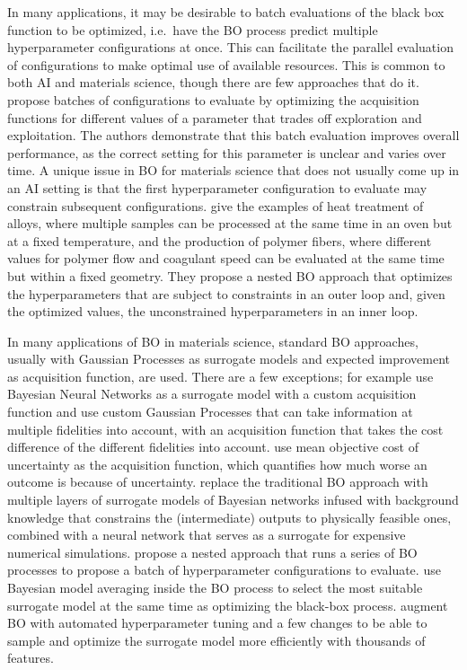 \documentclass{article}
\begin{document}
In many applications, it may be desirable to batch evaluations of the black box
function to be optimized, i.e.\ have the BO process predict multiple
hyperparameter configurations at once. This can facilitate the parallel
evaluation of configurations to make optimal use of available resources. This is
common to both AI and materials science, though there are few approaches that do
it. \cite{hase_phoenics_2018} propose batches of configurations to evaluate by
optimizing the acquisition functions for different values of a parameter that
trades off exploration and exploitation. The authors demonstrate that this batch
evaluation improves overall performance, as the correct setting for this
parameter is unclear and varies over time. A unique issue in BO for materials
science that does not usually come up in an AI setting is that the first
hyperparameter configuration to evaluate may constrain subsequent
configurations. \cite{vellanki2017} give the examples of heat treatment of
alloys, where multiple samples can be processed at the same time in an oven but
at a fixed temperature, and the production of polymer fibers, where different
values for polymer flow and coagulant speed can be evaluated at the same time
but within a fixed geometry. They propose a nested BO approach that optimizes
the hyperparameters that are subject to constraints in an outer loop and, given
the optimized values, the unconstrained hyperparameters in an inner loop.

\medskip

In many applications of BO in materials science, standard BO approaches, usually
with Gaussian Processes as surrogate models and expected improvement as
acquisition function, are used. There are a few exceptions; for example
\cite{hase_phoenics_2018} use Bayesian Neural Networks as a surrogate model with
a custom acquisition function and \cite{pilania_multi-fidelity_2017,patra_2020}
use custom Gaussian Processes that can take information at multiple fidelities
into account, with an acquisition function that takes the cost difference of the
different fidelities into account. \cite{dehghannasiri_optimal_2017} use mean
objective cost of uncertainty as the acquisition function, which quantifies how
much worse an outcome is because of uncertainty. \cite{ren_embedding_2020}
replace the traditional BO approach with multiple layers of surrogate models of
Bayesian networks infused with background knowledge that constrains the
(intermediate) outputs to physically feasible ones, combined with a neural
network that serves as a surrogate for expensive numerical simulations.
\cite{vellanki2017} propose a nested approach that runs a series of BO processes
to propose a batch of hyperparameter configurations to evaluate.
\cite{talapatra_autonomous_2018} use Bayesian model averaging inside the BO
process to select the most suitable surrogate model at the same time as
optimizing the black-box process. \cite{ueno_combo_2016} augment BO with
automated hyperparameter tuning and a few changes to be able to sample and
optimize the surrogate model more efficiently with thousands of features.
\end{document}
